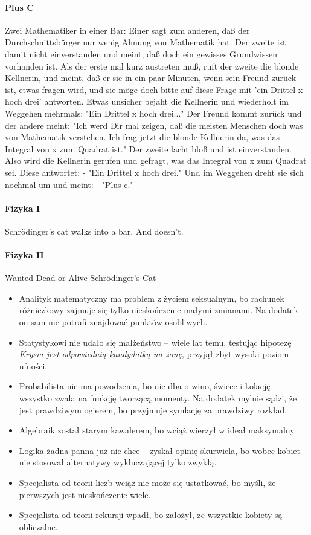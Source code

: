 \begin{parnumbers}
\paragraph{Plus C}Zwei Mathematiker in einer Bar: Einer sagt zum anderen, daß der Durchschnittsbürger nur wenig Ahnung von Mathematik hat. Der zweite ist damit nicht einverstanden und meint, daß doch ein gewisses Grundwissen vorhanden ist. Als der erste mal kurz austreten muß, ruft der zweite die blonde Kellnerin, und meint, daß er sie in ein paar Minuten, wenn sein Freund zurück ist, etwas fragen wird, und sie möge doch bitte auf diese Frage mit 'ein Drittel x hoch drei' antworten. Etwas unsicher bejaht die Kellnerin und wiederholt im Weggehen mehrmals: "Ein Drittel x hoch drei..." Der Freund kommt zurück und der andere meint: "Ich werd Dir mal zeigen, daß die meisten Menschen doch was von Mathematik verstehen. Ich frag jetzt die blonde Kellnerin da, was das Integral von x zum Quadrat ist." Der zweite lacht bloß und ist einverstanden. Also wird die Kellnerin gerufen und gefragt, was das Integral von x zum Quadrat sei. Diese antwortet: - "Ein Drittel x hoch drei." Und im Weggehen dreht sie sich nochmal um und meint: - "Plus c."

\paragraph{Fizyka I} Schrödinger's cat walks into a bar. And doesn't.
\paragraph{Fizyka II} Wanted Dead or Alive Schrödinger's Cat
\begin{itemize}
\item Analityk matematyczny ma problem z życiem seksualnym, bo rachunek różniczkowy zajmuje się tylko nieskończenie małymi zmianami. Na dodatek on sam nie potrafi znajdować punktów osobliwych.
\item Statystykowi nie udało się małżeństwo -- wiele lat temu, testując hipotezę \emph{Krysia jest odpowiednią kandydatką na żonę}, przyjął zbyt wysoki poziom ufności.
\item Probabilista nie ma powodzenia, bo nie dba o wino, świece i kolację - wszystko zwala na funkcję tworzącą momenty. Na dodatek mylnie sądzi, że jest prawdziwym ogierem, bo przyjmuje symlację za prawdziwy rozkład.
\item Algebraik został starym kawalerem, bo wciąż wierzył w ideał maksymalny.
\item Logika żadna panna już nie chce -- zyskał opinię skurwiela, bo wobec kobiet nie stosował alternatywy wykluczającej tylko zwykłą.
\item Specjalista od teorii liczb wciąż nie może się ustatkować, bo myśli, że pierwszych jest nieskończenie wiele.
\item Specjalista od teorii rekursji wpadł, bo założył, że wszystkie kobiety są obliczalne.
\end{itemize}

\end{parnumbers}
